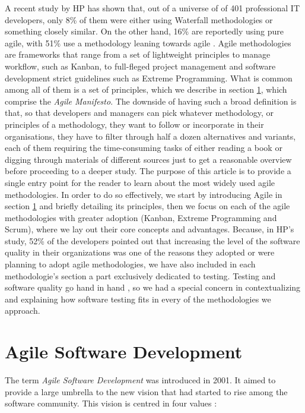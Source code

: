 \documentclass[conference]{IEEEtran}
\begin{document}
  A recent study by HP has shown that, out of a universe of of 401 professional IT
developers, only 8\% of them were either using Waterfall methodologies or something
closely similar. On the other hand, 16\% are reportedly using pure agile, with
51\% use a methodology leaning towards agile \cite{hp}.
  Agile methodologies are frameworks that range from a set of lightweight principles
to manage workflow, such as Kanban, to full-fleged project management and software
development strict guidelines such as Extreme Programming. What is common among all
of them is a set of principles, which we describe in section \ref{agile}, which
comprise the \textit{Agile Manifesto}.
  The downside of having such a broad definition is that, so that developers and
managers can pick whatever methodology, or principles of a methodology, they want
to follow or incorporate in their organisations, they have to filter through
half a dozen alternatives and variants, each of them requiring the time-consuming tasks
of either reading a book or digging through materials of different sources just to
get a reasonable overview before proceeding to a deeper study.
  The purpose of this article is to provide a single entry point for the reader to learn
about the most widely used agile methodologies. In order to do so effectively, we
start by introducing Agile in section \ref{agile} and briefly detailing its principles, then we
focus on each of the agile methodologies with greater adoption (Kanban, Extreme Programming and Scrum),
where we lay out their core concepts and advantages.
  Because, in HP's study, 52\% of the developers pointed out that increasing
the level of the software quality in their organizations was one of the reasons they
adopted or were planning to adopt agile methodologies, we have also included in each
methodologie's section a part exclusively dedicated to testing. Testing and software
quality go hand in hand \cite{qa}, so we had a special concern in contextualizing and
explaining how software testing fits in every of the methodologies we approach.


%
%
%
%
%
%
%

\section{Agile Software Development}
\label{agile}

The term \textit{Agile Software Development} was introduced in 2001. It aimed to provide a large umbrella to the new vision that had started to rise among the software community. This vision is centred in four values \cite{Martin:2006vx}:
\end{document}
